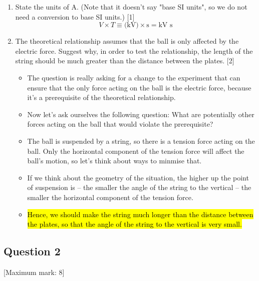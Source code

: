 \documentclass[a4paper,12pt]{article}
\DeclareRobustCommand{\hlans}[1]{{\sethlcolor{ForestGreen!30!white}\hl{#1}}}
\let\oldsubsection\subsection
\renewcommand\subsection{\clearpage\oldsubsection}
\begin{document}
\begin{enumerate}[label=(\alph*)]
\begin{enumerate}[label=(\roman*)]
          \item State the units of A. (Note that it doesn't say "base SI units", so we do not need a conversion to base SI units.) \hfill [1]
                $$V\times T \equiv \text{(kV)} \times \text{s} = \text{kV s}$$

          \item The theoretical relationship assumes that the ball is only affected by the electric force. Suggest why, in order to test the relationship, the length of the string should be much greater than the distance between the plates. \hfill [2]
                \begin{itemize}
                  \item The question is really asking for a change to the experiment that can ensure that the only force acting on the ball is the electric force, because it's a prerequisite of the theoretical relationship.
                  \item Now let's ask ourselves the following question: What are potentially other forces acting on the ball that would violate the prerequisite?
                  \item The ball is suspended by a string, so there is a tension force acting on the ball. Only the horizontal component of the tension force will affect the ball's motion, so let's think about ways to minmise that.
                  \item If we think about the geometry of the situation, the higher up the point of suspension is -- the smaller the angle of the string to the vertical -- the smaller the horizontal component of the tension force.
                  \item \hlans{Hence, we should make the string much longer than the distance between the plates, so that the angle of the string to the vertical is very small.}
                \end{itemize}
        \end{enumerate}
\end{enumerate}

\subsection{Question 2}

[Maximum mark: 8]
\end{document}
